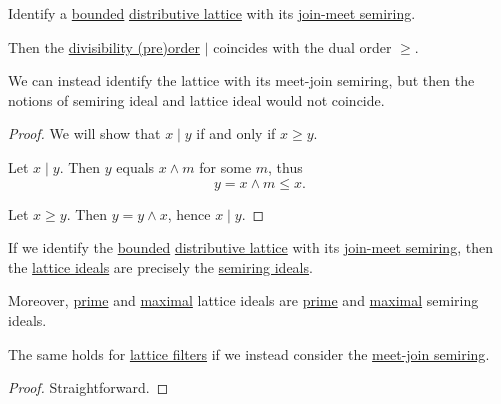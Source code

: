 \begin{proposition}\label{thm:lattice_divisibility}
  Identify a \hyperref[def:extremal_points/bounds]{bounded} \hyperref[def:distributive_lattice]{distributive lattice} with its \hyperref[ex:def:semiring/lattice]{join-meet semiring}.

  Then the \hyperref[thm:semiring_divisibility_order]{divisibility (pre)order} \( \mid \) coincides with the dual order \( \geq \).
\end{proposition}
\begin{comments}
  \item We can instead identify the lattice with its meet-join semiring, but then the notions of semiring ideal and lattice ideal would not coincide.
\end{comments}
\begin{proof}
  We will show that \( x \mid y \) if and only if \( x \geq y \).

  \SufficiencySubProof Let \( x \mid y \). Then \( y \) equals \( x \wedge m \) for some \( m \), thus
  \begin{equation*}
    y = x \wedge m \leq x.
  \end{equation*}

  \NecessitySubProof Let \( x \geq y \). Then \( y = y \wedge x \), hence \( x \mid y \).
\end{proof}

\begin{proposition}\label{thm:lattice_ideal_as_semiring_ideal}
  If we identify the \hyperref[def:extremal_points/bounds]{bounded} \hyperref[def:distributive_lattice]{distributive lattice} with its \hyperref[ex:def:semiring/lattice]{join-meet semiring}, then the \hyperref[def:lattice_ideal]{lattice ideals} are precisely the \hyperref[def:semiring_ideal]{semiring ideals}.

  Moreover, \hyperref[def:lattice_ideal/prime]{prime} and \hyperref[def:lattice_ideal/maximal]{maximal} lattice ideals are \hyperref[def:semiring_ideal/prime]{prime} and \hyperref[def:semiring_ideal/maximal]{maximal} semiring ideals.
\end{proposition}
\begin{comments}
  \item The same holds for \hyperref[def:lattice_ideal]{lattice filters} if we instead consider the \hyperref[ex:def:semiring/lattice]{meet-join semiring}.
\end{comments}
\begin{proof}
  Straightforward.
\end{proof}

